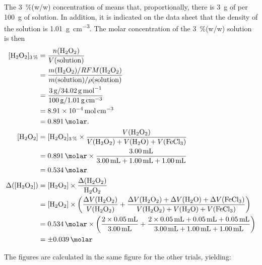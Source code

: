 \documentclass[a4paper, 12pt]{article}
\begin{document}
The \SI{3}{\%}(w/w) concentration of  means that, proportionally, there is \SI{3}{\g} of  per \SI{100}{\g} of solution. In addition, it is indicated on the data sheet \autocite{safety_h2o2} that the density of the solution is \SI{1.01}{\g\per\cm^3}. The molar concentration of the \SI{3}{\%}(w/w)  solution is then
\begin{align*}
    [\ce{H2O2}]_{\SI{3}{\%}}
    &= \dfrac{ n(\ce{H2O2}) }{ V(\text{solution}) }\\
    &= \dfrac{ m(\ce{H2O2}) / RFM(\ce{H2O2}) }{ m(\text{solution}) / \rho(\text{solution})}\\
    &= \dfrac{ \SI{3}{\g} / \SI{34.02}{\g\per\mol} } { \SI{100}{\g} / \SI{1.01}{\g\per\cm\cubed} }\\
    &= \SI{8.91E-4}{\mol\per\cm\cubed}\\
    &= \SI{0.891}{\molar}.\\
    [\ce{H2O2}]
    &= [\ce{H2O2}]_{\SI{3}{\%}} \times \dfrac{ V(\ce{H2O2}) }{ V(\ce{H2O2}) + V(\ce{H2O}) + V(\ce{FeCl3}) }\\
    &= \SI{0.891}{\molar} \times \dfrac{ \SI{3.00}{\mL} }{ \SI{3.00}{\mL} + \SI{1.00}{\mL} + \SI{1.00}{\mL} }\\
    &= \SI{0.534}{\molar}\\
    \Delta([\ce{H2O2}])
    &= [\ce{H2O2}] \times \fracDeltaP{\ce{H2O2}}\\
    &= [\ce{H2O2}] \times \left(\fracDelta{V(\ce{H2O2})} + \frac{ \Delta V(\ce{H2O2}) + \Delta V(\ce{H2O}) + \Delta V(\ce{FeCl3}) }{ V(\ce{H2O2}) + V(\ce{H2O}) + V(\ce{FeCl3}) }\right)\\
    &= \SI{0.534}{\molar} \times \left(\frac{ 2 \times \SI{0.05}{\mL} }{ \SI{3.00}{\mL} } + \frac{ 2 \times \SI{0.05}{\mL} + \SI{0.05}{\mL} + \SI{0.05}{\mL} }{ \SI{3.00}{\mL} + \SI{1.00}{\mL} + \SI{1.00}{\mL} }\right)\\
    &= \SI{+-0.039}{\molar}
\end{align*}

The figures are calculated in the same figure for the other trials, yielding:
\end{document}
